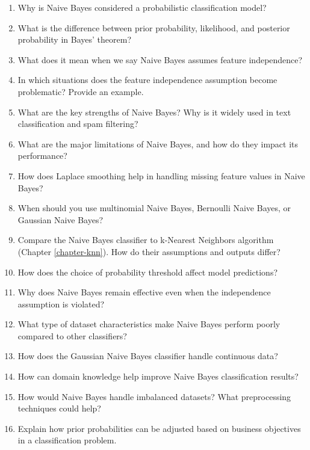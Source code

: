 \documentclass[
  11pt,
]{book}
\providecommand{\tightlist}{%
  \setlength{\itemsep}{0pt}\setlength{\parskip}{0pt}}
\theoremstyle{definition}
\theoremstyle{definition}
\theoremstyle{definition}
\theoremstyle{definition}
\theoremstyle{remark}
\begin{document}
\begin{enumerate}
\def\labelenumi{\arabic{enumi}.}
\tightlist
\item
  Why is Naive Bayes considered a probabilistic classification model?\\
\item
  What is the difference between prior probability, likelihood, and posterior probability in Bayes' theorem?\\
\item
  What does it mean when we say Naive Bayes assumes feature independence?\\
\item
  In which situations does the feature independence assumption become problematic? Provide an example.\\
\item
  What are the key strengths of Naive Bayes? Why is it widely used in text classification and spam filtering?\\
\item
  What are the major limitations of Naive Bayes, and how do they impact its performance?\\
\item
  How does Laplace smoothing help in handling missing feature values in Naive Bayes?\\
\item
  When should you use multinomial Naive Bayes, Bernoulli Naive Bayes, or Gaussian Naive Bayes?\\
\item
  Compare the Naive Bayes classifier to k-Nearest Neighbors algorithm (Chapter \ref{chapter-knn}). How do their assumptions and outputs differ?\\
\item
  How does the choice of probability threshold affect model predictions?\\
\item
  Why does Naive Bayes remain effective even when the independence assumption is violated?\\
\item
  What type of dataset characteristics make Naive Bayes perform poorly compared to other classifiers?\\
\item
  How does the Gaussian Naive Bayes classifier handle continuous data?\\
\item
  How can domain knowledge help improve Naive Bayes classification results?\\
\item
  How would Naive Bayes handle imbalanced datasets? What preprocessing techniques could help?\\
\item
  Explain how prior probabilities can be adjusted based on business objectives in a classification problem.
\end{enumerate}
\end{document}
